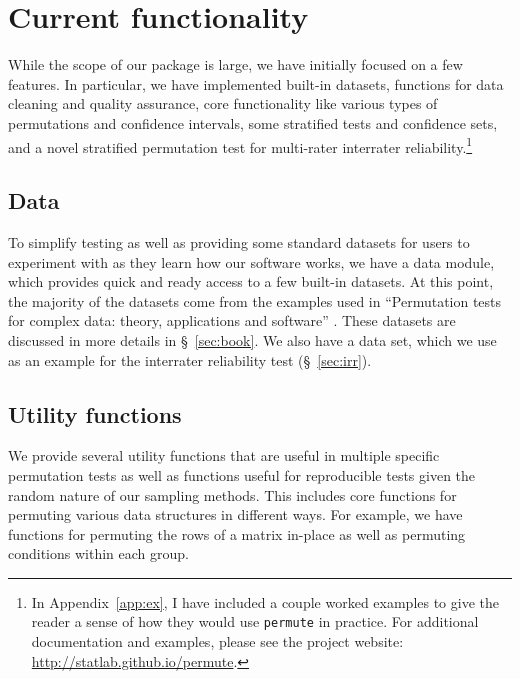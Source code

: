 \chapter{\label{ch:func}Current functionality}

While the scope of our package is large, we have initially focused on a few
features.  In particular, we have implemented built-in datasets, functions for
data cleaning and quality assurance, core functionality like various types of
permutations and confidence intervals, some stratified tests and confidence
sets, and a novel stratified permutation test for multi-rater interrater
reliability.\footnote{In Appendix~\ref{app:ex}, I have included a couple
worked examples to give the reader a sense of how they would use \texttt{permute}
in practice.
For additional documentation and examples, please see the project website:
\url{http://statlab.github.io/permute}.}

\section{Data}

To simplify testing as well as providing some standard datasets for
users to experiment with as they learn how our software works, we
have a data module, which provides quick and ready access to a few
built-in datasets. At this point, the majority of the datasets come
from the examples used in ``Permutation tests for complex data: theory,
applications and software'' \cite{pesarin2010permutation}.  These
datasets are discussed in more details in \S~\ref{sec:book}.  We also
have a data set, which we use as an example for the interrater
reliability test (\S~\ref{sec:irr}).

%

\section{Utility functions}

We provide several utility functions that are useful in multiple specific
permutation tests as well as functions useful for reproducible tests
given the random nature of our sampling methods.
This includes core functions for permuting various data structures in different
ways.  For example, we have functions for permuting the rows of a matrix
in-place as well as permuting conditions within each group.

